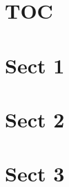 \documentclass[twoside,a4paper]{book}
\begin{document}
\section{TOC}

\makeatletter
{}
\makeatother

\cleardoublepage

\section{Sect 1}

\section{Sect 2}

\section{Sect 3}
\end{document}
